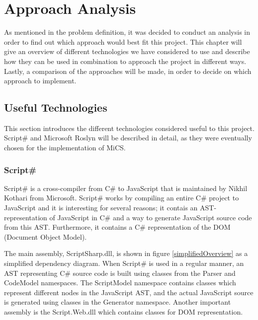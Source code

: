 \chapter{Approach Analysis}
	As mentioned in the problem definition, it was decided to conduct an analysis in order to find out which approach would best fit this project. This chapter will give an overview of different technologies we have considered to use and describe how they can be used in combination to approach the project in different ways. Lastly, a comparison of the approaches will be made, in order to decide on which approach to implement.

\section{Useful Technologies}
	This section introduces the different technologies considered useful to this project. Script\# and Microsoft Roslyn will be described in detail, as they were eventually chosen for the implementation of MiCS.

	

	\subsection{Script\#} %
	\label{sub:subsection_name}
		Script\# \cite{scriptsharp} is a cross-compiler from C\# to JavaScript that is maintained by Nikhil Kothari \cite{nikhilk} from Microsoft. Script\# works by compiling an entire C\# project to JavaScript and it is interesting for several reasons; it contais an AST-representation of JavaScript in C\# and a way to generate JavaScript source code from this AST. Furthermore, it contains a C\# representation of the DOM (Document Object Model).

		The main assembly, ScriptSharp.dll, is shown in figure \ref{simplifiedOverview} as a simplified dependency diagram. When Script\# is used in a regular manner, an AST representing C\# source code is built using classes from the Parser and CodeModel namespaces. The ScriptModel namespace contains classes which represent different nodes in the JavaScript AST, and the actual JavaScript source is generated using classes in the Generator namespace. Another important assembly is the Script.Web.dll which contains classes for DOM representation.


